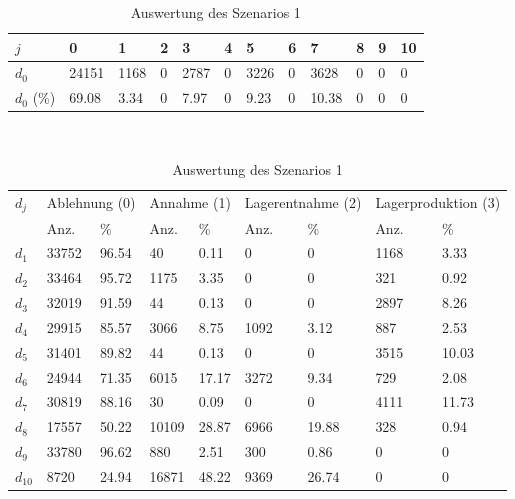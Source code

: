 \begin{table}[h!]
\renewcommand{\arraystretch}{1.5}
  \begin{center}
    \caption{Auswertung des Szenarios 1}  \label{AS1}
    \vspace*{3mm}
    \begin{tabular}{l l l l l l l l l l l l }  \hline 
         $j$ & 0 & 1  & 2 & 3 & 4  & 5 & 6 & 7 & 8 & 9 & 10  \\ \hline
$d_{0}$ &  24151 &  1168 &  0 &  2787 &  0 &  3226 &  0 &   3628 &  0 &  0 &  0 \\
$d_{0}$ (\%) &  69.08 &  3.34 &  0 &  7.97 &  0 &  9.23 &  0 &  10.38 &  0 &  0 &  0 \\
\hline
    \end{tabular} \\[3mm]
        \begin{tabular}{ l l l l l l l l l}   \hline    %
    $d_j$ & \multicolumn{2}{c}{Ablehnung (0)} & \multicolumn{2}{c}{Annahme (1)}  & \multicolumn{2}{c}{Lagerentnahme (2)} & \multicolumn{2}{c}{Lagerproduktion (3)}\\
    & Anz. & \% & Anz. & \% & Anz. & \% & Anz. & \% \\ \hline 
$d_{1}$  &  33752 &  96.54 &     40 &   0.11 &   0 &    0 &  1168 &   3.33 \\
$d_{2}$  &  33464 &  95.72 &   1175 &   3.35 &   0 &    0 &   321 &   0.92 \\
$d_{3}$  &  32019 &  91.59 &     44 &   0.13 &   0 &    0 &  2897 &   8.26 \\
$d_{4}$  &  29915 &  85.57 &   3066 &   8.75 &  1092 &   3.12 &   887 &   2.53 \\
$d_{5}$  &  31401 &  89.82 &     44 &   0.13 &   0 &    0 &  3515 &  10.03 \\
$d_{6}$  &  24944 &  71.35 &   6015 &  17.17 &  3272 &   9.34 &   729 &   2.08 \\
$d_{7}$  &  30819 &  88.16 &     30 &   0.09 &   0 &    0 &  4111 &  11.73 \\
$d_{8}$  &  17557 &  50.22 &  10109 &  28.87 &  6966 &  19.88 &   328 &   0.94 \\
$d_{9}$  &  33780 &  96.62 &    880 &   2.51 &   300 &   0.86 &   0 &    0 \\
$d_{10}$ &   8720 &  24.94 &  16871 &  48.22 &  9369 &  26.74 &   0 &    0 \\
          \hline
   \end{tabular} \\[3mm]
     \end{center}
\end{table}

